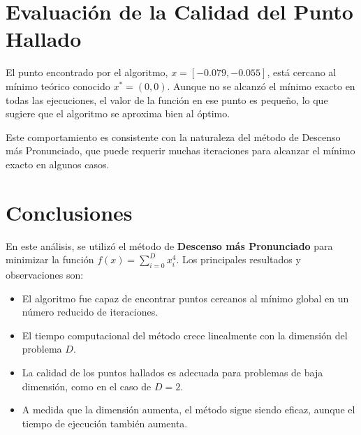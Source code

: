 \documentclass{article}
\begin{document}
\section{Evaluación de la Calidad del Punto Hallado}

El punto encontrado por el algoritmo, \( x = [-0.079, -0.055] \), está cercano al mínimo teórico conocido \( x^* = (0, 0) \). Aunque no se alcanzó el mínimo exacto en todas las ejecuciones, el valor de la función en ese punto es pequeño, lo que sugiere que el algoritmo se aproxima bien al óptimo.

Este comportamiento es consistente con la naturaleza del método de Descenso más Pronunciado, que puede requerir muchas iteraciones para alcanzar el mínimo exacto en algunos casos.

\section{Conclusiones}

En este análisis, se utilizó el método de \textbf{Descenso más Pronunciado} para minimizar la función \( f(x) = \sum_{i=0}^{D} x_i^4 \). Los principales resultados y observaciones son:

\begin{itemize}
    \item El algoritmo fue capaz de encontrar puntos cercanos al mínimo global en un número reducido de iteraciones.
    \item El tiempo computacional del método crece linealmente con la dimensión del problema \( D \).
    \item La calidad de los puntos hallados es adecuada para problemas de baja dimensión, como en el caso de \( D = 2 \).
    \item A medida que la dimensión aumenta, el método sigue siendo eficaz, aunque el tiempo de ejecución también aumenta.
\end{itemize}
\end{document}
